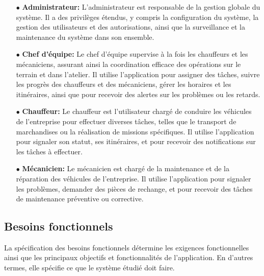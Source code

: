     
    \begin{itemize}

\item[$\bullet$] \textbf {Administrateur:} L'administrateur est responsable de la gestion globale du système. Il a des privilèges étendus, y compris la configuration du système, la gestion des utilisateurs et des autorisations, ainsi que la surveillance et la maintenance du système dans son ensemble. \\

        \item[$\bullet$] \textbf{Chef d'équipe:} Le chef d'équipe supervise à la fois les chauffeurs et les mécaniciens, assurant ainsi la coordination efficace des opérations sur le terrain et dans l'atelier. Il utilise l'application pour assigner des tâches, suivre les progrès des chauffeurs et des mécaniciens, gérer les horaires et les itinéraires, ainsi que pour recevoir des alertes sur les problèmes ou les retards. \\

        \item[$\bullet$] \textbf{Chauffeur:} Le chauffeur est l'utilisateur chargé de conduire les véhicules de l'entreprise pour effectuer diverses tâches, telles que le transport de marchandises ou la réalisation de missions spécifiques. Il utilise l'application pour signaler son statut, ses itinéraires, et pour recevoir des notifications sur les tâches à effectuer. \\

\item[$\bullet$] \textbf {Mécanicien:} Le mécanicien est chargé de la maintenance et de la réparation des véhicules de l'entreprise. Il utilise l'application pour signaler les problèmes, demander des pièces de rechange, et pour recevoir des tâches de maintenance préventive ou corrective.\\
        
    \end{itemize}


 
     

     


    \subsection{Besoins fonctionnels}
    La spécification des besoins fonctionnels détermine les exigences fonctionnelles ainsi que les principaux objectifs et fonctionnalités de l'application. En d'autres termes, elle spécifie ce que le système étudié doit faire.\\
    
